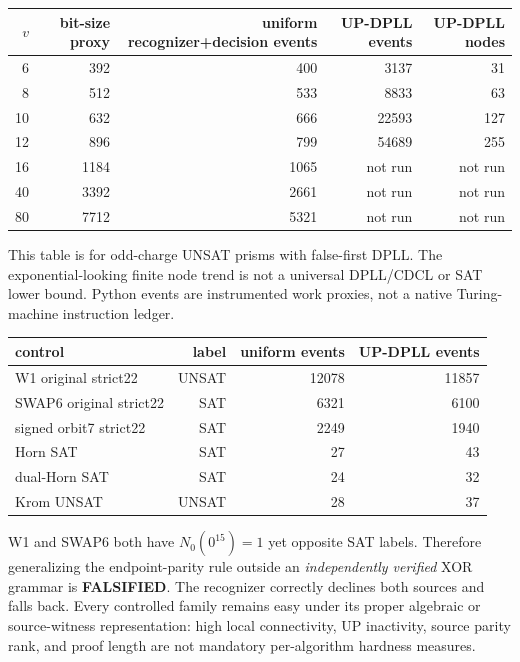 \documentclass[11pt]{article}
\begin{document}
\begin{center}\small
\begin{tabular}{rrrrr}\toprule
$v$&bit-size proxy&uniform recognizer+decision events&UP-DPLL events&UP-DPLL nodes\\\midrule
6&392&400&3137&31\\
8&512&533&8833&63\\
10&632&666&22593&127\\
12&896&799&54689&255\\
16&1184&1065&not run&not run\\
40&3392&2661&not run&not run\\
80&7712&5321&not run&not run\\\bottomrule
\end{tabular}
\end{center}
This table is for odd-charge UNSAT prisms with false-first DPLL. The exponential-looking finite node trend is not a universal DPLL/CDCL or SAT lower bound. Python events are instrumented work proxies, not a native Turing-machine instruction ledger.

\begin{center}\small
\begin{tabular}{lrrr}\toprule
control&label&uniform events&UP-DPLL events\\\midrule
W1 original strict22&UNSAT&12078&11857\\
SWAP6 original strict22&SAT&6321&6100\\
signed orbit7 strict22&SAT&2249&1940\\
Horn SAT&SAT&27&43\\
dual-Horn SAT&SAT&24&32\\
Krom UNSAT&UNSAT&28&37\\\bottomrule
\end{tabular}\end{center}
W1 and SWAP6 both have $N_0(0^{15})=1$ yet opposite SAT labels. Therefore generalizing the endpoint-parity rule outside an \emph{independently verified} XOR grammar is \textbf{FALSIFIED}. The recognizer correctly declines both sources and falls back. Every controlled family remains easy under its proper algebraic or source-witness representation: high local connectivity, UP inactivity, source parity rank, and proof length are not mandatory per-algorithm hardness measures.
\end{document}
